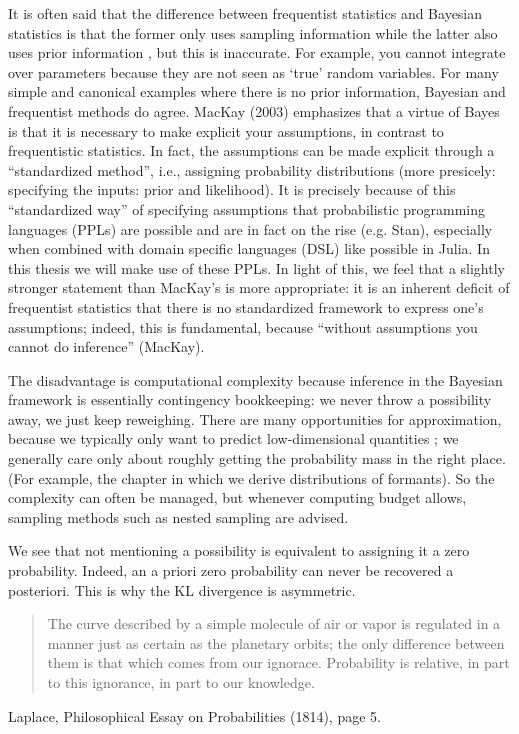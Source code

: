 It is often said that the difference between frequentist statistics and Bayesian statistics is that the former only uses sampling information while the latter also uses prior information \citep[e.g.,][]{Strang2019}, but this is inaccurate.
For example, you cannot integrate over parameters because they are not seen as `true' random variables.
For many simple and canonical examples where there is no prior information, Bayesian and frequentist methods do agree.
MacKay (2003) emphasizes that a virtue of Bayes is that it is necessary to make explicit your assumptions, in contrast to frequentistic statistics.
In fact, the assumptions can be made explicit through a ``standardized method'', i.e., assigning probability distributions (more presicely: specifying the inputs: prior and likelihood).
It is precisely because of this ``standardized way'' of specifying assumptions that probabilistic programming languages (PPLs) are possible and are in fact on the rise (e.g. Stan), especially when combined with domain specific languages (DSL) like possible in Julia.
In this thesis we will make use of these PPLs.
In light of this, we feel that a slightly stronger statement than MacKay's is more appropriate: it is an inherent deficit of frequentist statistics that there is no standardized framework to express one's assumptions; indeed, this is fundamental, because ``without assumptions you cannot do inference'' (MacKay).

The disadvantage is computational complexity because inference in the Bayesian framework is essentially contingency bookkeeping: we never throw a possibility away, we just keep reweighing.
There are many opportunities for approximation, because we typically only want to predict low-dimensional quantities \citep{MacKay1996}; we generally care only about roughly getting the probability mass in the right place.
(For example, the chapter in which we derive distributions of formants).
So the complexity can often be managed, but whenever computing budget allows, sampling methods such as nested sampling are advised.

We see that not mentioning a possibility is equivalent to assigning it a zero probability.
Indeed, an a priori zero probability can never be recovered a posteriori.
This is why the KL divergence is asymmetric.

\begin{quote}
The curve described by a simple molecule of air or vapor is regulated in a manner just as certain as the planetary orbits; the only difference between them is that which comes from our ignorace.
Probability is relative, in part to this ignorance, in part to our knowledge.
\end{quote}
Laplace, Philosophical Essay on Probabilities (1814), page 5.

